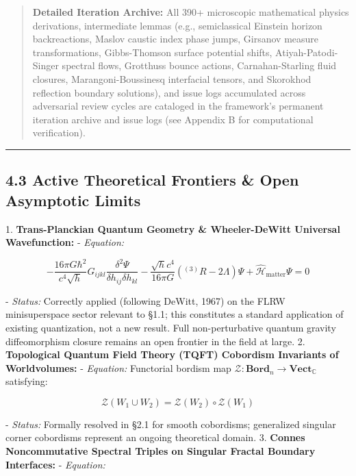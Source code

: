 \documentclass[11pt,a4paper]{article}
\theoremstyle{definition}\newtheorem{definition}{Definition}
\theoremstyle{remark}\newtheorem{remark}{Remark}
\begin{document}
\begin{quote}\textbf{Detailed Iteration Archive:} All 390+ microscopic mathematical physics derivations, intermediate lemmas (e.g., semiclassical Einstein horizon backreactions, Maslov caustic index phase jumps, Girsanov measure transformations, Gibbs-Thomson surface potential shifts, Atiyah-Patodi-Singer spectral flows, Grotthuss bounce actions, Carnahan-Starling fluid closures, Marangoni-Boussinesq interfacial tensors, and Skorokhod reflection boundary solutions), and issue logs accumulated across adversarial review cycles are cataloged in the framework's permanent iteration archive and issue logs (see Appendix B for computational verification).\end{quote}

\noindent\rule{\linewidth}{0.4pt}
\subsection{4.3 Active Theoretical Frontiers \& Open Asymptotic Limits}

1. \textbf{Trans-Planckian Quantum Geometry \& Wheeler-DeWitt Universal Wavefunction:}
- \textit{Equation:}


\begin{equation}
-\frac{16\pi G\hbar^2}{c^4\sqrt{h}} G_{ijkl} \frac{\delta^2 \Psi}{\delta h_{ij} \delta h_{kl}} - \frac{\sqrt{h} c^4}{16\pi G} ({}^{(3)}R - 2\Lambda) \Psi + \hat{\mathcal{H}}_{\text{matter}} \Psi = 0
\end{equation}


- \textit{Status:} Correctly applied (following DeWitt, 1967) on the FLRW minisuperspace sector relevant to §1.1; this constitutes a standard application of existing quantization, not a new result. Full non-perturbative quantum gravity diffeomorphism closure remains an open frontier in the field at large.
2. \textbf{Topological Quantum Field Theory (TQFT) Cobordism Invariants of Worldvolumes:}
- \textit{Equation:} Functorial bordism map $\mathcal{Z}: \mathbf{Bord}_n \to \mathbf{Vect}_{\mathbb{C}}$ satisfying:


\begin{equation}
\mathcal{Z}(W_1 \cup W_2) = \mathcal{Z}(W_2) \circ \mathcal{Z}(W_1)
\end{equation}


- \textit{Status:} Formally resolved in §2.1 for smooth cobordisms; generalized singular corner cobordisms represent an ongoing theoretical domain.
3. \textbf{Connes Noncommutative Spectral Triples on Singular Fractal Boundary Interfaces:}
- \textit{Equation:}
\end{document}
